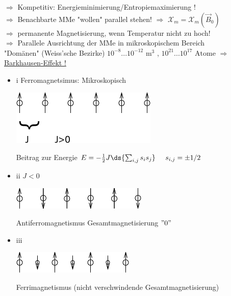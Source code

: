 \begin{itemize}
	$ \Rightarrow $ Kompetitiv: Energieminimierung/Entropiemaximierung !\\
	$ \Rightarrow $ Benachbarte MMe "wollen" parallel stehen!
	$ \Rightarrow $ $ \mathcal{X}_m =\mathcal{X}_m (\vec{B}_0) $ \\
	$ \Rightarrow $ permanente Magnetisierung, wenn Temperatur nicht zu hoch! \\
	$ \Rightarrow $ Parallele Ausrichtung der MMe in mikroskopischem Bereich\\
	\hspace{5mm}"Domänen" (Weiss'sche Bezirke) \hspace{3mm} $ 10^{-8} ... 10^{-12} \text{ m}^3 $ \hspace{2mm},\hspace{2mm} $ 10^{21}...10^{17} \text{ Atome} $
	$ \Rightarrow $ \underline{Barkhausen-Effekt !}
\end{itemize}
\newpage
\begin{itemize}
	\item i Ferromagnetsimus: Mikroskopisch \\
	\begin{center}
		\includegraphics[width=0.5\linewidth]{skizzen/17/17B06}
	\end{center}
	
	Beitrag zur Energie $ E= - \frac{1}{2}J \ds{\sum_{i,j} s_i s_j} \hspace{5mm} s_{i,j} = \pm 1/2 $ \\
	\item ii $ J<0 $ \\
	\begin{center}
		\includegraphics[width=0.5\linewidth]{skizzen/17/17B07}
	\end{center}
	
	Antiferromagnetismus
	Gesamtmagnetisierung $ "0" $
	\item iii
	\begin{center}
		\includegraphics[width=0.5\linewidth]{skizzen/17/17B08}
	\end{center}
	Ferrimagnetismus (nicht verschwindende Gesamtmagnetisierung)
\end{itemize}
